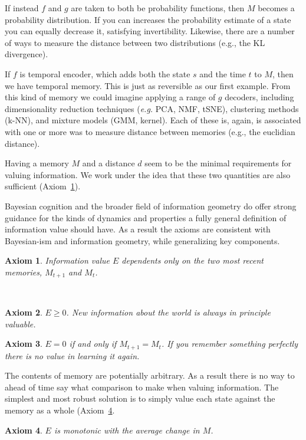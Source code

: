 \documentclass[9pt,twocolumn,twoside]{pnas-new}
\newtheorem{axiom}{Axiom}
\begin{document}
If instead $f$ and $g$ are taken to both be probability functions, then $M$ becomes a probability distribution. If you can increases the probability estimate of a state you can equally decrease it, satisfying invertibility. Likewise, there are a number of ways to measure the distance between two distributions (e.g., the KL divergence).

If $f$ is temporal encoder, which adds both the state $s$ and the time $t$ to $M$, then we have temporal memory. This is just as reversible as our first example. From this kind of memory we could imagine applying a range of $g$ decoders, including dimensionality reduction techniques (\textit{e.g.} PCA, NMF, tSNE), clustering methods (k-NN), and mixture models (GMM, kernel). Each of these is, again, is associated with one or more was to measure distance between memories (e.g., the euclidian distance).

Having a memory $M$ and a distance $d$ seem to be the minimal requirements for valuing information. We work under the idea that these two quantities are also  sufficient (Axiom~\ref{ax:1}).

Bayesian cognition and the broader field of information geometry do offer strong guidance for the kinds of dynamics and properties a fully general definition of information value should have. As a result the axioms are consistent with Bayesian-ism and information geometry, while generalizing key components. 

\begin{axiom} 
    Information value $E$ dependents only on the two most recent memories, $M_{t+1}$ and $M_{t}$.
    \label{ax:1}
\end{axiom} \\
\noindent

\begin{axiom}
    $E \geq 0$. New information about the world is always \textit{in principle} valuable.
    \label{ax:2}
\end{axiom}
\noindent

\begin{axiom}
    $E = 0$ if and only if $M_{t+1} = M_{t}$. If you remember something perfectly there is no value in learning it again. 
    \label{ax:3}
\end{axiom}
\noindent

The contents of memory are potentially arbitrary. As a result there is no way to ahead of time say what comparison to make when valuing information. The simplest and most robust solution is to simply value each state against the memory as a whole (Axiom~\ref{ax:4}. 
\begin{axiom}
    $E$ is monotonic with the average change in $M$.
    \label{ax:4}
\end{axiom}
\noindent
\end{document}
